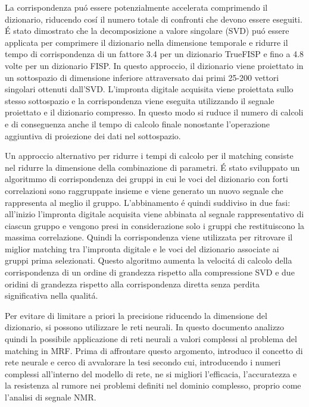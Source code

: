 \documentclass[a4paper,12pt]{report}
\begin{document}
 La corrispondenza pu\'o essere potenzialmente accelerata comprimendo il dizionario, riducendo cos\'i il numero totale di confronti che devono essere eseguiti. 
 \'E stato dimostrato che la decomposizione a valore singolare (SVD) pu\'o essere applicata per comprimere il dizionario nella dimensione temporale e ridurre il tempo di corrispondenza di un fattore 3.4 per un dizionario TrueFISP e fino a 4.8 volte per un dizionario FISP. 
 In questo approccio, il dizionario viene proiettato in un sottospazio di dimensione inferiore attraversato dai primi 25-200 vettori singolari ottenuti dall'SVD. 
 L'impronta digitale acquisita viene proiettata sullo stesso sottospazio e la corrispondenza viene eseguita utilizzando il segnale proiettato e il dizionario compresso. 
 In questo modo si ruduce il numero di calcoli e di conseguenza anche il tempo di calcolo finale nonostante l'operazione aggiuntiva di proiezione dei dati nel sottospazio. 
 
 Un approccio alternativo per ridurre i tempi di calcolo per il matching consiste nel ridurre la dimensione della combinazione di parametri. 
 \'E stato sviluppato un algoritmmo di corrispondenza dei gruppi in cui le voci del dizionario con forti correlazioni sono raggruppate insieme e viene generato un nuovo segnale che rappresenta al meglio il gruppo. 
 L'abbinamento \'e quindi suddiviso in due fasi: all'inizio  l'impronta digitale acquisita viene abbinata al segnale rappresentativo di ciascun gruppo e vengono presi in considerazione solo i gruppi che restituiscono la massima correlazione. 
 Quindi la corrispondenza viene utilizzata per ritrovare il miglior matching tra l'impronta digitale e le voci del dizionario associate ai gruppi prima selezionati. 
 Questo algoritmo aumenta la velocit\'a di calcolo della corrispondenza di un ordine di grandezza rispetto alla compressione SVD e due oridini di grandezza rispetto alla corrispondenza diretta senza perdita significativa nella qualit\'a. 
 
 Per evitare di limitare a priori la precisione riducendo la dimensione del dizionario, si possono utilizzare le reti neurali.
 In questo documento analizzo quindi la possibile applicazione di reti neurali a valori complessi al problema del matching in MRF.
 Prima di affrontare questo argomento, introduco il concetto di rete neurale e cerco di avvalorare la tesi secondo cui, introducendo i numeri complessi all'interno del modello di rete, ne si migliori l'efficacia, l'accuratezza e la resistenza al rumore nei problemi definiti nel dominio complesso, proprio come l'analisi di segnale NMR.
 
\end{document}
